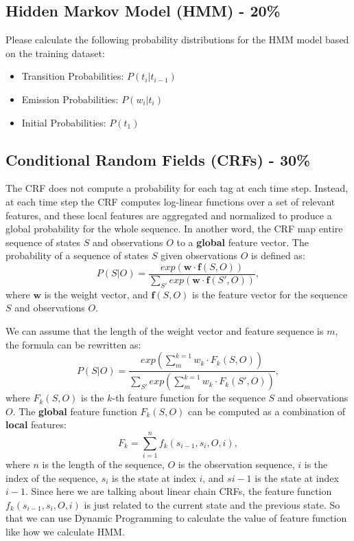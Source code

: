 \documentclass{article}
\begin{document}
\subsection*{Hidden Markov Model (HMM) - 20\%}

Please calculate the following probability distributions for the HMM model
based on the training dataset:

\begin{itemize}
    \item Transition Probabilities: $P(t_{i}|t_{i-1})$
    \item Emission Probabilities: $P(w_{i}|t_{i})$
    \item Initial Probabilities: $P(t_{1})$
\end{itemize}


\subsection*{Conditional Random Fields (CRFs) - 30\%}

The CRF does not compute a probability for each tag at each time step. 
Instead, at each time step the CRF computes log-linear functions over 
a set of relevant features, and these local features are aggregated and 
normalized to produce a global probability for the whole sequence.
In another word, the CRF map entire sequence of states $S$ and
observations $O$ to a \textbf{global} feature vector.
The probability of a sequence of states $S$ given observations $O$ is defined as:
$$P(S|O) = \frac{exp(\mathbf{w}\cdot \mathbf{f}(S, O) )}{ {\textstyle \sum_{S'}^{}exp(\mathbf{w}\cdot \mathbf{f}(S', O) )} },$$
where $\mathbf{w}$ is the weight vector, 
and $\mathbf{f}(S, O)$ is the feature vector for the sequence $S$ and observations $O$.

We can assume that the length of the weight vector and feature sequence is $m$, 
the formula can be rewritten as:
$$P(S|O) = \frac{exp( {\textstyle \sum_{m}^{k=1} w_{k} \cdot F_{k}(S, O) })}{ {\textstyle \sum_{S'}^{}exp( {\textstyle \sum_{m}^{k=1} w_{k} \cdot F_{k}(S', O) })} },$$
where $F_{k}(S, O)$ is the $k$-th feature function for the sequence $S$ and observations $O$.
The \textbf{global} feature function $F_{k}(S, O)$ can be computed as a combination of \textbf{local} features:
$$F_{k} =  \sum_{i=1}^{n}f_{k}(s_{i-1}, s_{i}, O, i),$$
where $n$ is the length of the sequence, $O$ is the observation sequence, 
$i$ is the index of the sequence, $s_{i}$ is the state at index $i$, 
and $s{i-1}$ is the state at index $i-1$.
Since here we are talking about linear chain CRFs, 
the feature function $f_{k}(s_{i-1}, s_{i}, O, i)$ is just related to the current state 
and the previous state. So that we can use Dynamic Programming to calculate 
the value of feature function like how we calculate HMM.
\end{document}
